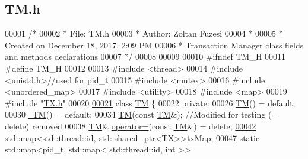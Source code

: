 \hypertarget{_t_m_8h_source}{}\subsection{T\+M.\+h}

\begin{DoxyCode}
00001 \textcolor{comment}{/* }
00002 \textcolor{comment}{ * File:   TM.h}
00003 \textcolor{comment}{ * Author: Zoltan Fuzesi}
00004 \textcolor{comment}{ * }
00005 \textcolor{comment}{ * Created on December 18, 2017, 2:09 PM}
00006 \textcolor{comment}{ * Transaction Manager class fields and methods declarations}
00007 \textcolor{comment}{ */}
00008 
00009 
00010 \textcolor{preprocessor}{#ifndef TM\_H}
00011 \textcolor{preprocessor}{#define TM\_H}
00012 
00013 \textcolor{preprocessor}{#include <thread>}
00014 \textcolor{preprocessor}{#include <unistd.h>}\textcolor{comment}{//used for pid\_t}
00015 \textcolor{preprocessor}{#include <mutex>}
00016 \textcolor{preprocessor}{#include <unordered\_map>}
00017 \textcolor{preprocessor}{#include <utility>}
00018 \textcolor{preprocessor}{#include <map>}
00019 \textcolor{preprocessor}{#include "\hyperlink{_t_x_8h}{TX.h}"}
00020 
\hypertarget{_t_m_8h_source.tex_l00021}{}\hyperlink{class_t_m}{00021} \textcolor{keyword}{class }\hyperlink{class_t_m}{TM} \{
00022 \textcolor{keyword}{private}:
00026     \hyperlink{class_t_m_a9b5afb6b9d7c5925ab5cc5c65078ac23_a9b5afb6b9d7c5925ab5cc5c65078ac23}{TM}() = \textcolor{keywordflow}{default}; 
00030     \hyperlink{class_t_m_a985f8cb24f685925ddd637c7030cd2b3_a985f8cb24f685925ddd637c7030cd2b3}{~TM}() = \textcolor{keywordflow}{default};
00034     \hyperlink{class_t_m_a9b5afb6b9d7c5925ab5cc5c65078ac23_a9b5afb6b9d7c5925ab5cc5c65078ac23}{TM}(\textcolor{keyword}{const} \hyperlink{class_t_m}{TM}&); \textcolor{comment}{//Modified for testing (= delete) removed }
00038 \textcolor{comment}{}    \hyperlink{class_t_m}{TM}& \hyperlink{class_t_m_a85a6b783f0566f0877bab6a7de977c0a_a85a6b783f0566f0877bab6a7de977c0a}{operator=}(\textcolor{keyword}{const} \hyperlink{class_t_m}{TM}&) = \textcolor{keyword}{delete}; 
\hypertarget{_t_m_8h_source.tex_l00042}{}\hyperlink{class_t_m_a0333dfa193ea99d7626de74a2b932e9b_a0333dfa193ea99d7626de74a2b932e9b}{00042}     std::map<std::thread::id, std::shared\_ptr<TX>>\hyperlink{class_t_m_a0333dfa193ea99d7626de74a2b932e9b_a0333dfa193ea99d7626de74a2b932e9b}{txMap};
\hypertarget{_t_m_8h_source.tex_l00047}{}\hyperlink{class_t_m_a81c3bd28ad2343a620fa070f8ac186ca_a81c3bd28ad2343a620fa070f8ac186ca}{00047}     \textcolor{keyword}{static} std::map<pid\_t, std::map< std::thread::id, int >> 

\end{DoxyCode}
